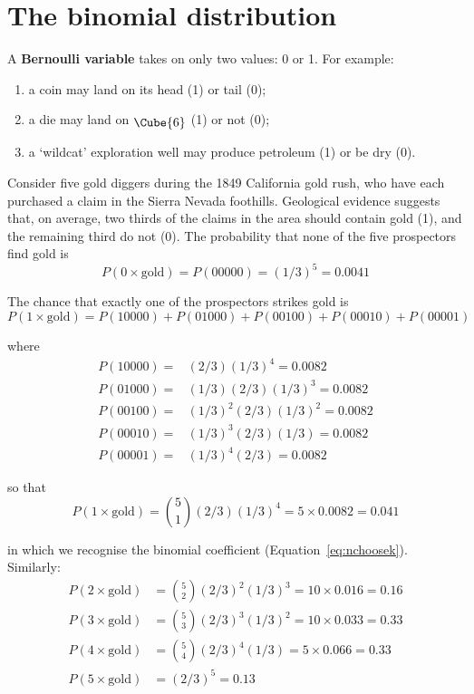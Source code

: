 \chapter{The binomial distribution}
\label{ch:binomial}

A \textbf{Bernoulli variable} takes on only two values: 0 or 1. For
example:

\begin{enumerate}
\item a coin may land on its head (1) or tail (0);
\item a die may land on $\raisebox{-2pt}{\Cube{6}}$ (1) or not (0);
\item a `wildcat' exploration well may produce petroleum (1) or be dry
  (0).
\end{enumerate}

Consider five gold diggers during the 1849 California gold rush, who
have each purchased a claim in the Sierra Nevada foothills. Geological
evidence suggests that, on average, two thirds of the claims in the
area should contain gold (1), and the remaining third do not (0). The
probability that none of the five prospectors find gold is
\[
P(0\times\mbox{gold}) = P(00000) = (1/3)^5 = 0.0041
\]

The chance that exactly one of the prospectors strikes gold is
\[
P(1\times\mbox{gold}) = P(10000) + P(01000) + P(00100) + P(00010) + P(00001)
\]

\noindent where
\begin{align*}
  P(10000) = & (2/3) (1/3)^4 = 0.0082 \\
  P(01000) = & (1/3) (2/3) (1/3)^3 = 0.0082 \\
  P(00100) = & (1/3)^2 (2/3) (1/3)^2 = 0.0082 \\
  P(00010) = & (1/3)^3 (2/3) (1/3) = 0.0082 \\
  P(00001) = & (1/3)^4 (2/3) = 0.0082
\end{align*}

\noindent so that
\[
P(1\times\mbox{gold}) = \binom{5}{1} (2/3) (1/3)^4 = {5}\times{0.0082} = 0.041
\]

\noindent in which we recognise the binomial coefficient
(Equation~\ref{eq:nchoosek}). Similarly:
\begin{align*}
P(2\times\mbox{gold}) & = \binom{5}{2} (2/3)^2 (1/3)^3 = {10}\times{0.016} = 0.16\\
P(3\times\mbox{gold}) & = \binom{5}{3} (2/3)^3 (1/3)^2 = {10}\times{0.033} = 0.33\\
P(4\times\mbox{gold}) & = \binom{5}{4} (2/3)^4 (1/3) = {5}\times{0.066} = 0.33\\
P(5\times\mbox{gold}) & = (2/3)^5 = 0.13
\end{align*}

